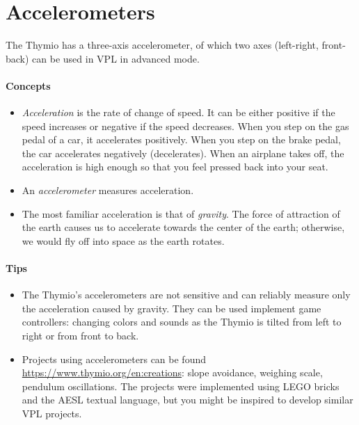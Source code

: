 \documentclass[11pt,a4paper,english]{article}
\begin{document}

\section{Accelerometers}

The Thymio has a three-axis accelerometer, of which two axes
(left-right, front-back) can be used in VPL in advanced mode.

\paragraph{Concepts}
\begin{itemize}

\item \emph{Acceleration} is the rate of change of speed. It can be
either positive if the speed increases or negative if the speed
decreases. When you step on the gas pedal of a car, it accelerates
positively. When you step on the brake pedal, the car accelerates
negatively (decelerates). When an airplane takes off, the acceleration
is high enough so that you feel pressed back into your seat.

\item An \emph{accelerometer} measures acceleration.

\item The most familiar acceleration is that of \emph{gravity}. The
force of attraction of the earth causes us to accelerate towards the
center of the earth; otherwise, we would fly off into space as the
earth rotates.

\end{itemize}

\paragraph{Tips}
\begin{itemize}

\item The Thymio's accelerometers are not sensitive and can reliably
measure only the acceleration caused by gravity. They can be used
implement game controllers: changing colors and sounds as the Thymio is
tilted from left to right or from front to back.

\item Projects using accelerometers can be found
\href{https://www.thymio.org/en:creations}%
{https://www.thymio.org/en:creations}: slope avoidance, weighing scale,
pendulum oscillations. The projects were implemented using LEGO bricks
and the AESL textual language, but you might be inspired to develop
similar VPL projects.

\end{itemize}
\end{document}
